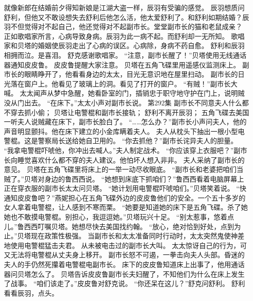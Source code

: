 \documentclass[a4paper,12pt,UTF8,twoside]{ctexbook}
\begin{document}
        就像新郎在结婚前夕得知新娘是江湖大盗一样，辰羽有受骗的感觉。  
        辰羽想质问舒利，但他又不敢设想失去舒利后他怎么活，他太爱舒利了。和舒利如期结婚？辰羽不但觉得对不起自己，他还觉得对不起副市长。堂堂副市长的猫和老鼠成亲？  
        正如歌唱家所言，心病导致身病。辰羽为此一病不起。而舒利却一无所知。  
        歌唱家和贝塔的婚姻使辰羽走出了心病的误区。心病除，身病不药自愈。  
        舒利和辰羽相拥而泣。是喜泪。  
        舒克感谢歌唱家。  
        “注意，副市长醒了！”贝塔使用无线通话器通知皮皮鲁。  
        皮皮鲁提醒大家注意。  
        贝塔在五角飞碟里用遥感仪监测床上。  
        副市长的眼睛睁开了，他看看身边的太太，目光无意识地在屋里扫动。  
        副市长的日光落在窗户上。他看见了玻璃上的洞。看见了打开的窗户。  
        “有贼！”副市长大喊。  
        太太闻声从梦中急醒，她看卧室的门，插销忠于职守地守护在门上，说明贼没从门出去。  
        “在床下。”太太小声对副市长说。          第292集  
        副市长不同意夫人什么都不穿去抓小偷；  
        贝塔让电警棍和副市长接轨；  
        舒利不离开辰羽；  
        五角飞碟去美国    
        一听夫人说贼藏在床下，副市长脸白了。  
        “……怎么办？”副市长小声问夫人，他的声音明显颤抖。他在床下建立的小金库瞒着夫人。  
        夫人从枕头下抽出一根小型电警棍。这是警察局长送给她自卫用的。  
        “你去抓他？”副市长诧异夫人的胆量。  
        “我拿电警棍吓唬他，你冲出去喊人。”夫人制定战术。  
        “你应该穿上衣服吧？”副市长向睡觉喜欢什么都不穿的夫人建议。他怕坏人想入非非。        
        夫人采纳了副市长的意见。  
        贝塔在五角飞碟里将床上的一举一动尽收眼底。  
        “副市长和老婆把咱们当贼了。”贝塔对身边的鲁西西说。  
        “她想到床底下抓咱们？”鲁西西看着电脑屏幕上正在穿衣服的副市长太太问贝塔。  
        “她计划用电警棍吓唬咱们。”贝塔笑着说。  
        “快通知皮皮鲁吧？”燕妮担心在五角飞碟外边的皮皮鲁他们的安全。一个五十多岁的女人拿着电警棍，让人感到不寒而栗。  
        “她要是知道她的床下是五角飞碟。杀了她她也不敢摸电警棍。别担心，我逗逗她。”贝塔玩兴十足。  
        “别太惹事，悠着点儿。”鲁西西叮嘱贝塔。她想尽快去美国找约翰。  
        “放心，绝对恰到好处，点到为止。”贝塔现在政策性极强。  
        当副市长和太太准备同时行动时，太太突然鬼使神差地使用电警棍猛击夫君。  
        从未被电击过的副市长大叫。  
        太太惊讶自己的行为，可又无法将电警棍从丈夫身上移开。  
        副市长怒不可遏，一拳击向夫人头部。昏迷的夫人的手仍然死攥着电警棍电副市长。        
        床下的皮皮鲁知道床上出事了，他用通话器问贝塔怎么了。  
        贝塔告诉皮皮鲁副市长夫妇醒了，不知他们为什么在床上发生了战事。  
        “咱们该走了。”皮皮鲁对舒克说。  
        “你还呆在这儿？”舒克问舒利。  
        舒利看看辰羽，点头。  
\end{document}
